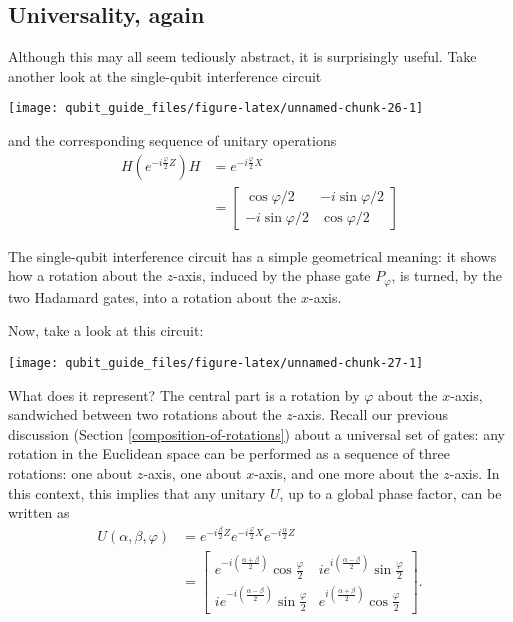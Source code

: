 \documentclass[fleqn]{article}
\newenvironment{idea}{\noindent}{\medskip}
\begin{document}
\hypertarget{universality-again}{%
\subsection{Universality, again}\label{universality-again}}

Although this may all seem tediously abstract, it is surprisingly useful.
Take another look at the single-qubit interference circuit

\begin{center}\texttt{[image: qubit\_guide\_files/figure-latex/unnamed-chunk-26-1]} \end{center}

and the corresponding sequence of unitary operations
\[
  \begin{aligned}
    H \left(
      e^{-i\frac{\varphi}{2}Z}
    \right) H
    &= e^{-i\frac{\varphi}{2}X}
  \\&= \begin{bmatrix}
      \cos\varphi/2 & -i\sin\varphi/2
    \\-i\sin\varphi/2 & \cos\varphi/2
    \end{bmatrix}
  \end{aligned}
\]

\begin{idea}
The single-qubit interference circuit has a simple geometrical meaning: it shows how a rotation about the \(z\)-axis, induced by the phase gate \(P_\varphi\), is turned, by the two Hadamard gates, into a rotation about the \(x\)-axis.

\end{idea}

Now, take a look at this circuit:

\begin{center}\texttt{[image: qubit\_guide\_files/figure-latex/unnamed-chunk-27-1]} \end{center}

What does it represent?
The central part is a rotation by \(\varphi\) about the \(x\)-axis, sandwiched between two rotations about the \(z\)-axis.
Recall our previous discussion (Section \ref{composition-of-rotations}) about a universal set of gates: any rotation in the Euclidean space can be performed as a sequence of three rotations: one about \(z\)-axis, one about \(x\)-axis, and one more about the \(z\)-axis.
In this context, this implies that any unitary \(U\), up to a global phase factor, can be written as
\[
  \begin{aligned}
    U(\alpha, \beta, \varphi)
    &= e^{-i\frac{\beta}{2}Z} e^{-i\frac{\varphi}{2}X} e^{-i\frac{\alpha}{2}Z}
  \\&= \begin{bmatrix}
      e^{-i\left(\frac{\alpha+\beta}{2}\right)}\cos\frac{\varphi}{2}
      & ie^{i\left(\frac{\alpha-\beta}{2}\right)}\sin\frac\varphi{2}
    \\ie^{-i\left(\frac{\alpha-\beta}{2}\right)}\sin\frac\varphi{2}
      & e^{i\left(\frac{\alpha+\beta}{2}\right)}\cos\frac\varphi{2}
    \end{bmatrix}.
  \end{aligned}
\]
\end{document}
